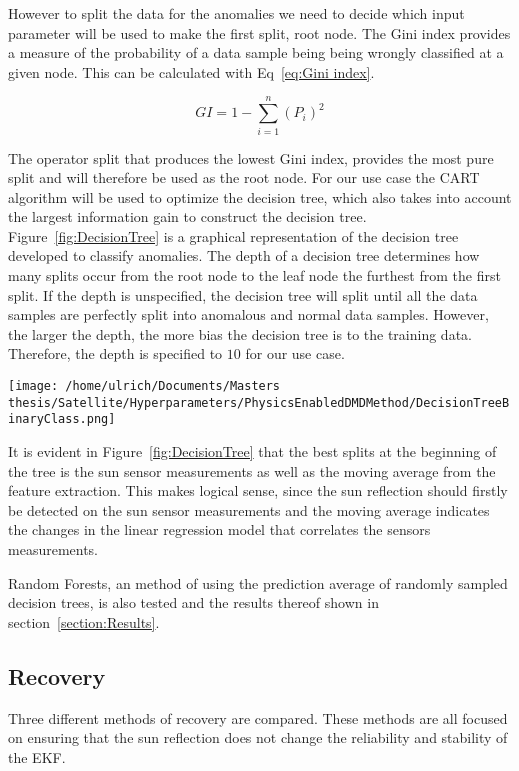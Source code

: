 \documentclass[letterpaper, 10 pt, conference]{ieeeconf}  %
\begin{document}
However to split the data for the anomalies we need to decide which input parameter will be used to make the first split, root node. The Gini index provides a measure of the probability of a data sample being being wrongly classified at a given node. This can be calculated with Eq~\ref{eq:Gini index}.

\begin{equation}
GI = 1 - \sum_{i = 1}^{n}{(P_i)^2}
\label{eq:Gini index}
\end{equation}

The operator split that produces the lowest Gini index, provides the most pure split and will therefore be used as the root node. For our use case the CART algorithm will be used to optimize the decision tree, which also takes into account the largest information gain to construct the decision tree. Figure~\ref{fig:DecisionTree} is a graphical representation of the decision tree developed to classify anomalies. The depth of a decision tree determines how many splits occur from the root node to the leaf node the furthest from the first split. If the depth is unspecified, the decision tree will split until all the data samples are perfectly split into anomalous and normal data samples. However, the larger the depth, the more bias the decision tree is to the training data. Therefore, the depth is specified to $10$ for our use case.

\begin{figure*}[!htb]
	\centering
	\texttt{[image: /home/ulrich/Documents/Masters thesis/Satellite/Hyperparameters/PhysicsEnabledDMDMethod/DecisionTreeBinaryClass.png]}
	\label{fig:DecisionTree}
	\caption{Decision Tree}
\end{figure*}

It is evident in Figure~\ref{fig:DecisionTree} that the best splits at the beginning of the tree is the sun sensor measurements as well as the moving average from the feature extraction. This makes logical sense, since the sun reflection should firstly be detected on the sun sensor measurements and the moving average indicates the changes in the linear regression model that correlates the sensors measurements.

Random Forests, an method of using the prediction average of randomly sampled decision trees, is also tested and the results thereof shown in section~\ref{section:Results}.  


\subsection{Recovery}
Three different methods of recovery are compared. These methods are all focused on ensuring that the sun reflection does not change the reliability and stability of the EKF.
\end{document}

